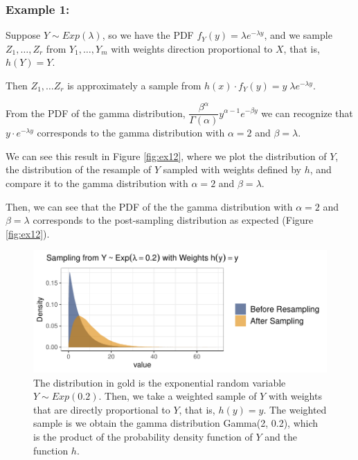 \documentclass[12pt,twoside]{smiththesis}
\begin{document}
\newpage

\hypertarget{example-1}{%
\subsubsection{Example 1:}\label{example-1}}

Suppose \(Y \sim Exp(\lambda)\), so we have the PDF \(f_Y(y) = \lambda e^{-\lambda y}\), and we sample \(Z_1,\dots,Z_r\) from \(Y_1, \dots, Y_m\) with weights direction proportional to \(X\), that is, \(h(Y) = Y\).

Then \(Z_1,\dots Z_r\) is approximately a sample from \(h(x) \cdot f_Y(y) = y \; \lambda e^{-\lambda y}\).

From the PDF of the gamma distribution, \(\dfrac{\beta^\alpha}{\Gamma(\alpha) }y^{\alpha - 1} e^{-\beta y}\) we can recognize that \(y \cdot e^{-\lambda y}\) corresponds to the gamma distribution with \(\alpha = 2\) and \(\beta = \lambda\).

We can see this result in Figure \ref{fig:ex12}, where we plot the distribution of \(Y\), the distribution of the resample of \(Y\) sampled with weights defined by \(h\), and compare it to the gamma distribution with \(\alpha = 2\) and \(\beta = \lambda\).

Then, we can see that the PDF of the the gamma distribution with \(\alpha = 2\) and \(\beta = \lambda\) corresponds to the post-sampling distribution as expected (Figure \ref{fig:ex12}).
\begin{figure}

{\centering \includegraphics[width=1\linewidth]{thesis_files/figure-latex/unnamed-chunk-23-1} 

}

\caption{\label{fig:ex12} The distribution in gold is the exponential random variable $Y \sim Exp(0.2)$. Then, we take a weighted sample of $Y$ with weights that are directly proportional to $Y$, that is, $h(y)=y$. The weighted sample is we obtain the gamma distribution Gamma(2, 0.2), which is the product of the probability density function of $Y$ and the function $h$.}\label{fig:unnamed-chunk-23}
\end{figure}
\newpage
\end{document}
